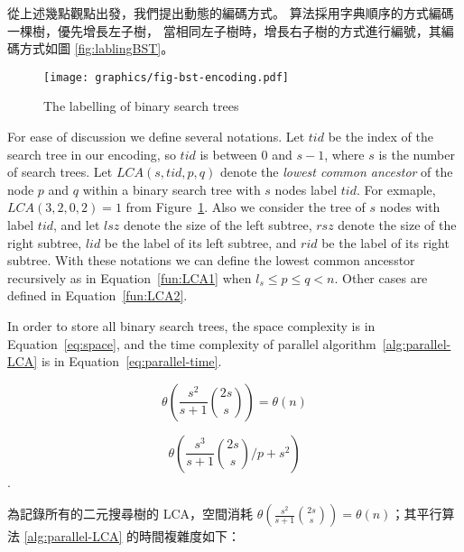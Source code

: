 從上述幾點觀點出發，我們提出動態的編碼方式。
算法採用字典順序的方式編碼一棵樹，優先增長左子樹，
當相同左子樹時，增長右子樹的方式進行編號，其編碼方式如圖 \ref{fig:lablingBST}。
\fi

\begin{figure}[!thb]
  \centering
  \texttt{[image: graphics/fig-bst-encoding.pdf]}
  \caption{The labelling of binary search trees}
  \label{fig:labelingBST}
\end{figure}

For ease of discussion we define several notations.  Let
$\mathit{tid}$ be the index of the search tree in our encoding, so
$\mathit{tid}$ is between 0 and $s - 1$, where $s$ is the number of
search trees.  Let $\mathit{LCA}(s, \mathit{tid}, p, q)$ denote the
{\em lowest common ancestor} of the node $p$ and $q$ within a binary
search tree with $s$ nodes label $\mathit{tid}$.  For exmaple,
$\mathit{LCA}(3, 2, 0, 2) = 1$ from Figure~\ref{fig:labelingBST}.
Also we consider the tree of $s$ nodes with label $\mathit{tid}$, and
let $\mathit{lsz}$ denote the size of the left subtree, $\mathit{rsz}$
denote the size of the right subtree, $\mathit{lid}$ be the label of
its left subtree, and $\mathit{rid}$ be the label of its right
subtree.  With these notations we can define the lowest common
ancesstor recursively as in Equation~\ref{fun:LCA1} when $l_s \le
  p \le q < n$.  Other cases are defined in Equation~\ref{fun:LCA2}. 




In order to store all binary search trees, the space complexity is in
Equation~\ref{eq:space}, and the time complexity of parallel
algorithm~\ref{alg:parallel-LCA} is in
Equation~\ref{eq:parallel-time}.


\begin{equation} \label{eq:space}
\theta\left(\frac{s^2}{s+1} \binom{2s}{s}\right) =
\theta\left(n\right)
\end{equation}


\begin{equation} \label{eq:parallel-time}
\theta\left(\frac{s^3}{s+1} \binom{2s}{s} \bigg/ p + s^2 \right)
\end{equation}.

\iffalse

為記錄所有的二元搜尋樹的 LCA，空間消耗 $\theta\left(\frac{s^2}{s+1}
\binom{2s}{s}\right) = \theta\left(n\right)$；其平行算法
\ref{alg:parallel-LCA} 的時間複雜度如下：


